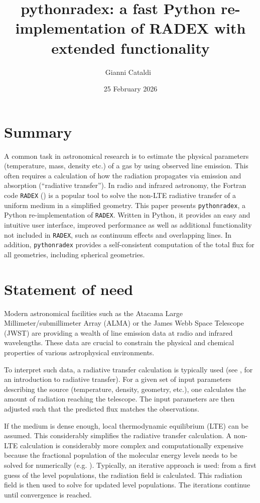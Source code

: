 \documentclass[
]{article}
\title{pythonradex: a fast Python re-implementation of RADEX with
extended functionality}
\author[1]{Gianni Cataldi%
    \,\orcidlink{0000-0002-2700-9676}\,%
    }
\affil[1]{National Astronomical Observatory of Japan, 2-21-1 Osawa,
Mitaka, Tokyo 181-8588, Japan%
    \,\protect\href{https://ror.org/052rrw050}{\protect\rorlogo}\,%
  }
\date{25 February 2026}
\begin{document}
\maketitle

\section{Summary}\label{summary}

A common task in astronomical research is to estimate the physical
parameters (temperature, mass, density etc.) of a gas by using observed
line emission. This often requires a calculation of how the radiation
propagates via emission and absorption (``radiative transfer''). In
radio and infrared astronomy, the Fortran code \texttt{RADEX}
() is a popular
tool to solve the non-LTE radiative transfer of a uniform medium in a
simplified geometry. This paper presents \texttt{pythonradex}, a Python re-implementation of
\texttt{RADEX}. Written in Python, it provides an easy and intuitive user interface, improved performance as well as additional functionality not included in \texttt{RADEX}, such as continuum effects and overlapping lines. In addition, \texttt{pythonradex} provides a self-consistent computation of the total flux for all geometries, including spherical geometries. 

\section{Statement of need}\label{statement-of-need}

Modern astronomical facilities such as the Atacama Large
Millimeter/submillimeter Array (ALMA) or the James Webb Space Telescope
(JWST) are providing a wealth of line emission data at radio and
infrared wavelengths. These data are crucial to constrain the physical
and chemical properties of various astrophysical environments.

To interpret such data, a radiative transfer calculation is typically
used (see , for an
introduction to radiative transfer). For a given set of input parameters
describing the source (temperature, density, geometry, etc.), one
calculates the amount of radiation reaching the telescope. The input
parameters are then adjusted such that the predicted flux matches the
observations.

If the medium is dense enough, local thermodynamic equilibrium (LTE) can
be assumed. This considerably simplifies the radiative transfer
calculation. A non-LTE calculation is considerably more complex and
computationally expensive because the fractional population of the
molecular energy levels needs to be solved for numerically (e.g.
). Typically, an
iterative approach is used: from a first guess of the level populations,
the radiation field is calculated. This radiation field is then used to
solve for updated level populations. The iterations continue until
convergence is reached.
\end{document}
